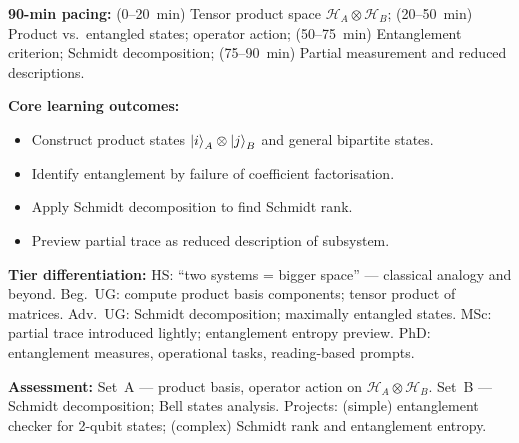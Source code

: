 \documentclass[11pt,a4paper]{article}
\begin{document}
\medskip
\begin{tcolorbox}[modulebox, title={Module~I.2 / L09: Tensor Products: Composite Systems \& Entanglement}]
\textbf{90-min pacing:} (0--20~min) Tensor product space $\mathcal{H}_A\otimes\mathcal{H}_B$;
(20--50~min) Product vs.\ entangled states; operator action;
(50--75~min) Entanglement criterion; Schmidt decomposition;
(75--90~min) Partial measurement and reduced descriptions.

\medskip\textbf{Core learning outcomes:}
\begin{itemize}[leftmargin=1.4em,topsep=2pt,itemsep=1pt]
  \item Construct product states $\ket{i}_A\otimes\ket{j}_B$ and general bipartite states.
  \item Identify entanglement by failure of coefficient factorisation.
  \item Apply Schmidt decomposition to find Schmidt rank.
  \item Preview partial trace as reduced description of subsystem.
\end{itemize}

\medskip\textbf{Tier differentiation:}
HS: ``two systems = bigger space'' --- classical analogy and beyond.
Beg.\ UG: compute product basis components; tensor product of matrices.
Adv.\ UG: Schmidt decomposition; maximally entangled states.
MSc: partial trace introduced lightly; entanglement entropy preview.
PhD: entanglement measures, operational tasks, reading-based prompts.

\medskip\textbf{Assessment:}
Set~A --- product basis, operator action on $\mathcal{H}_A\otimes\mathcal{H}_B$.
Set~B --- Schmidt decomposition; Bell states analysis.
Projects: (simple) entanglement checker for 2-qubit states; (complex) Schmidt rank and entanglement entropy.
\end{tcolorbox}
\end{document}
